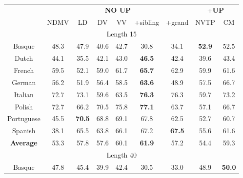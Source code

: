 \documentclass[11pt]{article}
\begin{document}
\begin{table}[tbp]
\centering
\small
\begin{tabular}{ccccccccc}
\hline
\multicolumn{1}{c|}{} &
  \multicolumn{6}{c|}{\bf\textsc{NO UP}} &
  \multicolumn{2}{c}{+\bf\textsc{UP}} \\ \cline{2-9} 
\multicolumn{1}{c|}{} &
  NDMV &
  LD &
  DV &
  \multicolumn{1}{c|}{VV} &
  +sibling &
  \multicolumn{1}{c|}{+grand} &
  NVTP &
  CM \\ \hline
\multicolumn{9}{c}{Length  15} \\ \hline
\multicolumn{1}{c|}{Basque} &
  48.3 &
  47.9 &
  40.6 &
  \multicolumn{1}{c|}{42.7} &
  30.8 &
  \multicolumn{1}{c|}{34.1} &
  \textbf{52.9} &
  52.5 \\
\multicolumn{1}{c|}{Dutch} &
  44.1 &
  35.5 &
  42.1 &
  \multicolumn{1}{c|}{43.0} &
  \textbf{46.5} &
  \multicolumn{1}{c|}{42.4} &
  39.6 &
  43.4 \\
\multicolumn{1}{c|}{French} &
  59.5 &
  52.1 &
  59.0 &
  \multicolumn{1}{c|}{61.7} &
  \textbf{65.7} &
  \multicolumn{1}{c|}{62.9} &
  59.9 &
  61.6 \\
\multicolumn{1}{c|}{German} &
  56.2 &
  51.9 &
  56.4 &
  \multicolumn{1}{c|}{58.5} &
  \textbf{63.6} &
  \multicolumn{1}{c|}{48.9} &
  57.5 &
  66.7 \\
\multicolumn{1}{c|}{Italian} &
  72.7 &
  73.1 &
  59.6 &
  \multicolumn{1}{c|}{63.5} &
  \textbf{76.3} &
  \multicolumn{1}{c|}{76.3} &
  59.7 &
  73.2 \\
\multicolumn{1}{c|}{Polish} &
  72.7 &
  66.2 &
  70.5 &
  \multicolumn{1}{c|}{75.8} &
  \textbf{77.1} &
  \multicolumn{1}{c|}{63.7} &
  57.1 &
  66.7 \\
\multicolumn{1}{c|}{Portuguese} &
  45.5 &
  \textbf{70.5} &
  68.8 &
  \multicolumn{1}{c|}{69.1} &
  67.8 &
  \multicolumn{1}{c|}{62.5} &
  52.7 &
  60.7 \\
\multicolumn{1}{c|}{Spanish} &
  38.1 &
  65.5 &
  63.8 &
  \multicolumn{1}{c|}{66.1} &
  67.2 &
  \multicolumn{1}{c|}{\textbf{67.5}} &
  55.6 &
  61.6 \\ \hline
\multicolumn{1}{c|}{\textbf{Average}} &
  53.3 &
  57.8 &
  57.6 &
  \multicolumn{1}{c|}{60.1} &
  \textbf{61.9} &
  \multicolumn{1}{c|}{57.2} &
  54.4 &
  59.3 \\ \hline
\multicolumn{9}{c}{Length  40} \\ \hline
\multicolumn{1}{c|}{Basque} &
  47.8 &
  45.4 &
  39.9 &
  \multicolumn{1}{c|}{42.4} &
  30.5 &
  \multicolumn{1}{c|}{33.0} &
  48.9 &
  \textbf{50.0} \\

\end{tabular}
\end{table}
\end{document}

